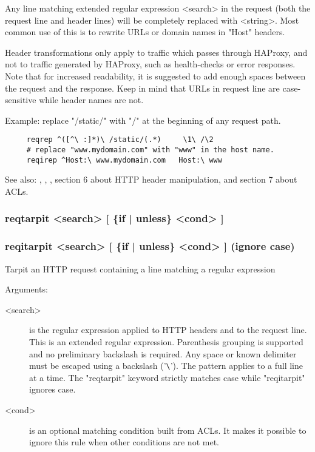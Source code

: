   Any line matching extended regular expression <search> in the request (both
  the request line and header lines) will be completely replaced with <string>.
  Most common use of this is to rewrite URLs or domain names in "Host" headers.

  Header transformations only apply to traffic which passes through HAProxy,
  and not to traffic generated by HAProxy, such as health-checks or error
  responses. Note that for increased readability, it is suggested to add enough
  spaces between the request and the response. Keep in mind that URLs in
  request line are case-sensitive while header names are not.

  Example: replace "/static/" with "/" at the beginning of any request path.
  \begin{verbatim}
     reqrep ^([^\ :]*)\ /static/(.*)     \1\ /\2
     # replace "www.mydomain.com" with "www" in the host name.
     reqirep ^Host:\ www.mydomain.com   Host:\ www
  \end{verbatim}

  See also: , , , section 6 about HTTP header
            manipulation, and section 7 about ACLs.

\subsubsection[reqtarpit]{reqtarpit  <search> [ \{if | unless\} <cond> ]}
\subsubsection[reqitarpit]{reqitarpit <search> [ \{if | unless\} <cond> ]  (ignore case)}


  Tarpit an HTTP request containing a line matching a regular expression


  Arguments:
  \begin{description}
  \item[<search>] is the regular expression applied to HTTP headers and to the
              request line. This is an extended regular expression. Parenthesis
              grouping is supported and no preliminary backslash is required.
              Any space or known delimiter must be escaped using a backslash
              ('\verb|\|'). The pattern applies to a full line at a time. The
              "reqtarpit" keyword strictly matches case while "reqitarpit"
              ignores case.

  \item[<cond>] is an optional matching condition built from ACLs. It makes it
              possible to ignore this rule when other conditions are not met.
  \end{description}

